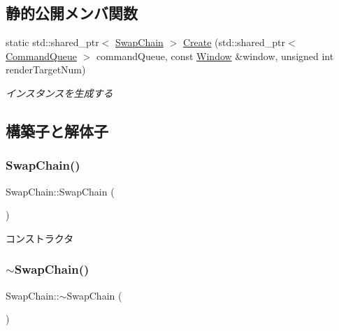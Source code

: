 \subsection*{静的公開メンバ関数}
\begin{DoxyCompactItemize}
\item 
static std\+::shared\+\_\+ptr$<$ \mbox{\hyperlink{class_swap_chain}{Swap\+Chain}} $>$ \mbox{\hyperlink{class_swap_chain_a9a5c8d8da8a81471009df868054c02e3}{Create}} (std\+::shared\+\_\+ptr$<$ \mbox{\hyperlink{class_command_queue}{Command\+Queue}} $>$ command\+Queue, const \mbox{\hyperlink{class_window}{Window}} \&window, unsigned int render\+Target\+Num)
\begin{DoxyCompactList}\small\item\em インスタンスを生成する \end{DoxyCompactList}\end{DoxyCompactItemize}


\subsection{構築子と解体子}
\mbox{\label{class_swap_chain_ab1e68cac26bb0b4e97b68b9e4a3086a4}} 
\subsubsection{\texorpdfstring{Swap\+Chain()}{SwapChain()}}
{\footnotesize\ttfamily Swap\+Chain\+::\+Swap\+Chain (\begin{DoxyParamCaption}{ }\end{DoxyParamCaption})}



コンストラクタ 

\mbox{\label{class_swap_chain_a58c288346a3fa211fbcc2cec594bfa68}} 
\subsubsection{\texorpdfstring{$\sim$\+Swap\+Chain()}{~SwapChain()}}
{\footnotesize\ttfamily Swap\+Chain\+::$\sim$\+Swap\+Chain (\begin{DoxyParamCaption}{ }\end{DoxyParamCaption})}



